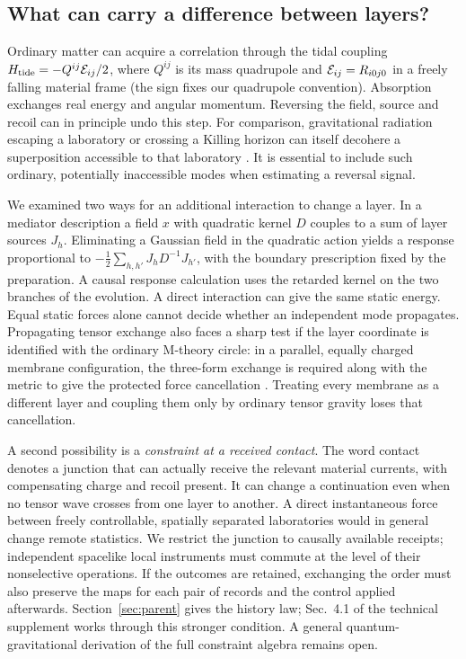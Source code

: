 \documentclass[11pt,a4paper]{article}
\begin{document}
\subsection{What can carry a difference between layers?}
Ordinary matter can acquire a correlation through the tidal coupling \(H_{\rm tide}=-Q^{ij}{\cal E}_{ij}/2\), where \(Q^{ij}\) is its mass quadrupole and \({\cal E}_{ij}=R_{i0j0}\) in a freely falling material frame (the sign fixes our quadrupole convention). Absorption exchanges real energy and angular momentum. Reversing the field, source and recoil can in principle undo this step. For comparison, gravitational radiation escaping a laboratory or crossing a Killing horizon can itself decohere a superposition accessible to that laboratory \cite{horizondeco}. It is essential to include such ordinary, potentially inaccessible modes when estimating a reversal signal.

We examined two ways for an additional interaction to change a layer. In a mediator description a field \(x\) with quadratic kernel \(D\) couples to a sum of layer sources \(J_h\). Eliminating a Gaussian field in the quadratic action yields a response proportional to \(-\tfrac12\sum_{h,h'}J_h D^{-1}J_{h'}\), with the boundary prescription fixed by the preparation. A causal response calculation uses the retarded kernel on the two branches of the evolution. A direct interaction can give the same static energy. Equal static forces alone cannot decide whether an independent mode propagates. Propagating tensor exchange also faces a sharp test if the layer coordinate is identified with the ordinary M-theory circle: in a parallel, equally charged membrane configuration, the three-form exchange is required along with the metric to give the protected force cancellation \cite{bfss,witten,m2}. Treating every membrane as a different layer and coupling them only by ordinary tensor gravity loses that cancellation.

A second possibility is a \emph{constraint at a received contact}. The word contact denotes a junction that can actually receive the relevant material currents, with compensating charge and recoil present. It can change a continuation even when no tensor wave crosses from one layer to another. A direct instantaneous force between freely controllable, spatially separated laboratories would in general change remote statistics. We restrict the junction to causally available receipts; independent spacelike local instruments must commute at the level of their nonselective operations. If the outcomes are retained, exchanging the order must also preserve the maps for each pair of records and the control applied afterwards. Section~\ref{sec:parent} gives the history law; Sec.~4.1 of the technical supplement works through this stronger condition. A general quantum-gravitational derivation of the full constraint algebra remains open.
\end{document}
